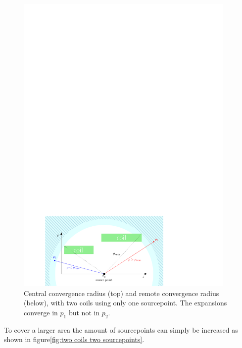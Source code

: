 \begin{figure}[htbp]
\begin{minipage}{0.49\textwidth}
		\includegraphics[width=0.95\textwidth]{images/KAFCAFigures/two_coils_remote.pdf}
	      \end{minipage}
	      \caption{Central convergence radius (top) and remote convergence radius (below), with two coils using only one sourcepoint. The expansions converge in $p_1$ but not in $p_2$.}
	      \label{fig:two coils one sourcepoint}
	\end{figure}
	To cover a larger area the amount of sourcepoints can simply be increased as shown in figure\ref{fig:two coils two sourcepoints}.
